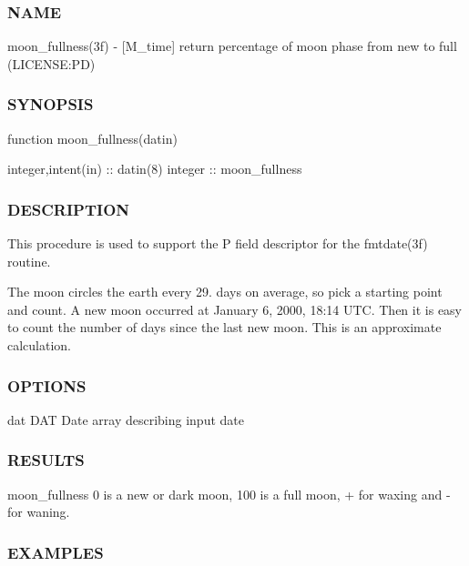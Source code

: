 \subsubsection*{N\+A\+ME}

moon\+\_\+fullness(3f) -\/ \mbox{[}M\+\_\+time\mbox{]} return percentage of moon phase from new to full (L\+I\+C\+E\+N\+SE\+:PD) \subsubsection*{S\+Y\+N\+O\+P\+S\+IS}

function moon\+\_\+fullness(datin)

integer,intent(in) \+:\+: datin(8) integer \+:\+: moon\+\_\+fullness

\subsubsection*{D\+E\+S\+C\+R\+I\+P\+T\+I\+ON}

This procedure is used to support the P field descriptor for the fmtdate(3f) routine.

The moon circles the earth every 29. days on average, so pick a starting point and count. A new moon occurred at January 6, 2000, 18\+:14 U\+TC. Then it is easy to count the number of days since the last new moon. This is an approximate calculation.

\subsubsection*{O\+P\+T\+I\+O\+NS}

dat D\+AT Date array describing input date

\subsubsection*{R\+E\+S\+U\+L\+TS}

moon\+\_\+fullness 0 is a new or dark moon, 100 is a full moon, + for waxing and -\/ for waning.

\subsubsection*{E\+X\+A\+M\+P\+L\+ES}

